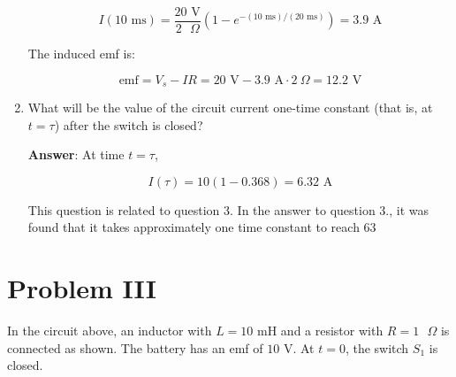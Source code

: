 \documentclass{article}
\begin{document}
\begin{enumerate}
        $$
        I(10\text{ ms}) = \frac{20 \text{ V}}{2\text{ }\Omega} \left(1-e^{-(10\text{ ms})/(20\text{ ms})}\right) = 3.9\text{ A} 
        $$

        The induced emf is:

        $$
        \text{emf} = V_s - IR= 20\text{ V} - 3.9\text{ A} \cdot 2~\Omega=12.2\text{ V} 
        $$
        \else
        \vskip 60pt
        \fi

  \item What will be the value of the circuit current one-time constant (that is, at $t=\tau$) after the switch is closed?

        \ifsolutions
        \textbf{Answer}: At time $t = \tau$,

        $$I(\tau) = 10(1-0.368) = 6.32\text{ A}$$

        This question is related to question 3. In the answer to question 3., it was found that it takes approximately one time constant to reach $63$%
        \else

        \newpage
        \fi

\end{enumerate}

\section{Problem III}



In the circuit above, an inductor with $L=10\text{ mH}$ and a resistor with $R=1\text{ }\Omega$ is connected as shown. The battery has an emf of $10\text{ V}$. At $t=0$, the switch $S_1$ is closed.
\end{document}
